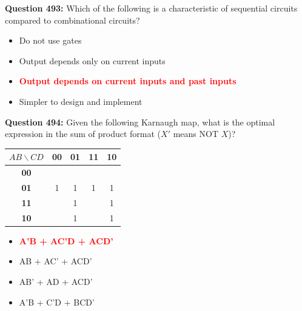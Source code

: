 \documentclass[12pt,a4paper]{article}
\begin{document}
\vspace{0.5cm}

\vspace{0.5cm}

\textbf{Question 493:} Which of the following is a characteristic of sequential circuits compared to combinational circuits?

\begin{itemize}
    \item[\textbf{A.}] Do not use gates
    \item[\textbf{B.}] Output depends only on current inputs
    \item[\textbf{C.}] \textcolor{red}{\textbf{Output depends on current inputs and past inputs}}
    \item[\textbf{D.}] Simpler to design and implement
\end{itemize}

\vspace{0.5cm}

\vspace{0.5cm}

\textbf{Question 494:} Given the following Karnaugh map, what is the optimal expression in the sum of product format ($X'$ means NOT $X$)?

\begin{center}
\renewcommand{\arraystretch}{1.4}
\begin{tabular}{|c|c|c|c|c|}
\hline
$AB \backslash CD$ & \textbf{00} & \textbf{01} & \textbf{11} & \textbf{10} \\ \hline
\textbf{00} & & & & \\ \hline
\textbf{01} & 1 & 1 & 1 & 1 \\ \hline
\textbf{11} & & 1 & & 1 \\ \hline
\textbf{10} & & 1 & & 1 \\ \hline
\end{tabular}
\end{center}

\begin{itemize}
    \item[\textbf{A.}] \textcolor{red}{\textbf{A'B + AC'D + ACD'}}
    \item[\textbf{B.}] AB + AC' + ACD'
    \item[\textbf{C.}] AB' + AD + ACD'
    \item[\textbf{D.}] A'B + C'D + BCD'
\end{itemize}

\vspace{0.5cm}
\end{document}
